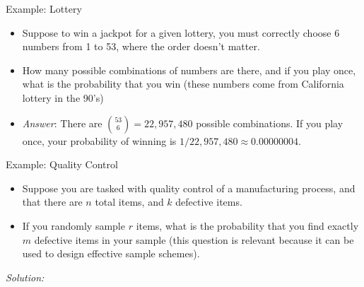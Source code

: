 \begin{frame}[allowframebreaks]{Example: Lottery}

\begin{itemize}
  \item Suppose to win a jackpot for a given lottery, you must correctly choose 6 numbers from 1 to 53, where the order doesn't matter. 
  \item How many possible combinations of numbers are there, and if you play once, what is the probability that you win (these numbers come from California lottery in the 90's)
  
  \item \emph{Answer}: There are $\binom{53}{6} = 22,957,480$ possible combinations. If you play once, your probability of winning is $1/22,957,480 \approx 0.00000004$.
\end{itemize}

\end{frame}

\begin{frame}{Example: Quality Control}
\begin{itemize}
  \item Suppose you are tasked with quality control of a manufacturing process, and that there are $n$ total items, and $k$ defective items. 
  \item If you randomly sample $r$ items, what is the probability that you find exactly $m$ defective items in your sample (this question is relevant because it can be used to design effective sample schemes).
\end{itemize}
  
  \emph{Solution:}
  
  
  
\end{frame}

